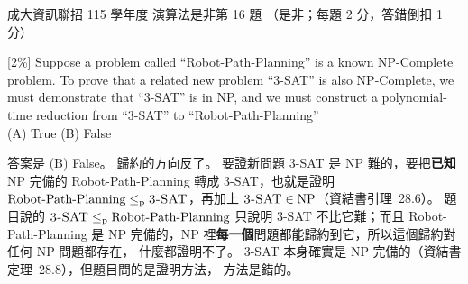 \begin{pastexam}[label={px:ncku-115-prog-13}]{成大資訊聯招 115 學年度 演算法是非第 16 題}
（是非；每題 2 分，答錯倒扣 1 分）

[2\%] Suppose a problem called ``Robot-Path-Planning'' is a known NP-Complete problem. To prove that a
related new problem ``3-SAT'' is also NP-Complete, we must demonstrate that ``3-SAT'' is in NP, and we must
construct a polynomial-time reduction from ``3-SAT'' to ``Robot-Path-Planning''\\
(A) True \qquad (B) False
\end{pastexam}

\begin{pastsoln}
答案是 (B) False。 歸約的方向反了。 要證新問題 \textsc{3-SAT} 是 NP 難的，要把\textbf{已知} NP 完備的
Robot-Path-Planning 轉成 \textsc{3-SAT}，也就是證明 $\text{Robot-Path-Planning} \le_{\mathrm{p}}
\textsc{3-SAT}$，再加上 $\textsc{3-SAT} \in \mathrm{NP}$（資結書引理~28.6）。 題目說的
$\textsc{3-SAT} \le_{\mathrm{p}} \text{Robot-Path-Planning}$ 只說明 \textsc{3-SAT} 不比它難；而且
Robot-Path-Planning 是 NP 完備的，NP 裡\textbf{每一個}問題都能歸約到它，所以這個歸約對任何 NP 問題都存在，
什麼都證明不了。 \textsc{3-SAT} 本身確實是 NP 完備的（資結書定理~28.8），但題目問的是證明方法，
方法是錯的。
\end{pastsoln}
